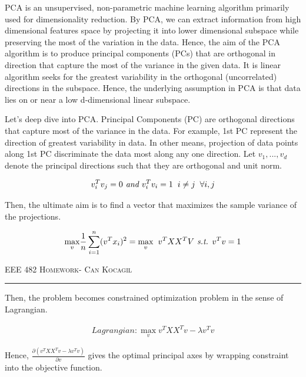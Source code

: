 \documentclass[12pt]{amsart}
\begin{document}
\bigskip
PCA is an unsupervised, non-parametric machine learning algorithm primarily used for dimensionality reduction. By PCA, we can extract information from high dimensional features space by projecting it into lower dimensional subspace while preserving the most of the variation in the data. Hence, the aim of the PCA algorithm is to produce principal components (PCs) that are orthogonal in direction that capture the most of the variance in the given data. It is linear algorithm seeks for the greatest variability in the orthogonal (uncorrelated) directions in the subspace. Hence, the underlying assumption in PCA is that data lies on or near a low d-dimensional linear subspace. 

\bigskip
Let's deep dive into PCA. Principal Components (PC) are orthogonal directions that capture most of the variance in the data. For example, 1st PC represent the direction of greatest variability in data. In other means, projection of data points along 1st PC discriminate the data most along any one direction. Let $v_1,...,v_d$ denote the principal directions such that they are orthogonal and unit norm.

\begin{equation}
    v_i^Tv_j = 0 \textit{ and } v_i^Tv_i = 1 \hspace{2mm}  i \neq j  \hspace{2mm} \forall i,j 
\end{equation}

Then, the ultimate aim is to find a vector that maximizes the sample variance of the projections.


\begin{equation}
    \underset{v}{\mathrm{max}} \frac{1}{n} \sum_{i=1}^n (v^Tx_i)^2 = \underset{v}{\mathrm{max}} \hspace{2mm} \textbf{$v^{T}XX^{T}V $} \textit{ s.t. $v^Tv = 1$}
\end{equation}


\newpage
{\scshape EEE 482} \hfill {\scshape \large  Homework-\relax} \hfill {\scshape Can Kocagil}
\smallskip
\hrule
\vspace{2mm}

Then, the problem becomes constrained optimization problem in the sense of Lagrangian.

\begin{align}
    Lagrangian: \operatorname*{max}_v v^TXX^Tv -\lambda v^Tv
\end{align}
  
 
Hence, $\frac{\partial (v^TXX^Tv -\lambda v^Tv)}{\partial v}$ gives the optimal principal axes by wrapping constraint into the objective function.
\end{document}
